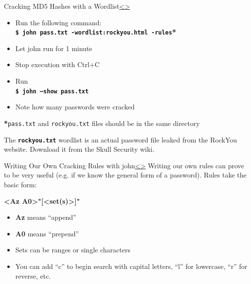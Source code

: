 \documentclass[12pt]{extarticle}
\newcommand{\code}[1]{\texttt{\bfseries#1}}
\newenvironment{instructionblock}{\Large\bgroup}{\egroup}
\begin{document}
\pagebreak
\begin{slide}{Cracking MD5 Hashes with a Wordlist}{\hyperref[slide 10]{\textless}\hyperref[slide 12]{\textgreater}}
	\vskip 10pt
	\begin{instructionblock}
		\begin{itemize}
			\item Run the following command:\\
				\code{\$ john pass.txt -wordlist:rockyou.html -rules}\textbf{*}
			\item Let john run for 1 minute
			\item Stop execution with Ctrl+C
			\item Run \\
				\code{\$ john --show pass.txt}
			\item Note how many passwords were cracked
		\end{itemize}
	\end{instructionblock}
\end{slide}
\textbf{*}\texttt{pass.txt} and \texttt{rockyou.txt} files should be in the same directory
\vfill

The \code{rockyou.txt} wordlist is an actual password file leaked from the RockYou website. Download it from the Skull Security wiki. \cite{rockyou}

\pagebreak
\begin{slide}{Writing Our Own Cracking Rules with john}{\hyperref[slide 11]{\textless}\hyperref[slide 13]{\textgreater}}
	\begin{instructionblock}
	Writing our own rules can prove to be very useful (e.g. if we know the general form of a password). Rules take the basic form: 
		
			\hskip 50pt \textbf{\textless Az \textbar  A0\textgreater"[\textless set(s)\textgreater ]"}

		\begin{itemize}
			\item \textbf{Az} means ``append''
			\item \textbf{A0} means ``prepend''
			\item Sets can be ranges or single characters
			\item You can add ``c'' to begin search with capital letters, ``l'' for lowercase, ``r'' for reverse, etc. \cite{cheat}
			
		\end{itemize}
	\end{instructionblock}
\end{slide}
\vfill
\end{document}

